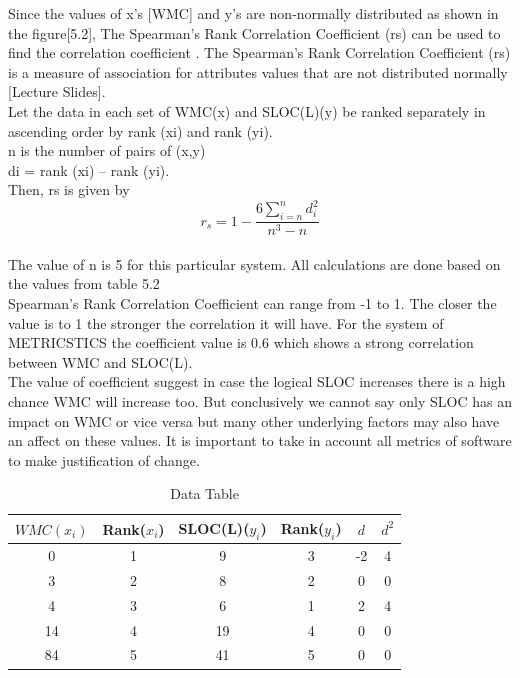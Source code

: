 \documentclass[12pt,letterpaper]{report}
\begin{document}
Since the values of x’s [WMC] and y’s are non-normally distributed as shown in the figure[5.2], The Spearman’s Rank Correlation Coefficient (rs) can be used to find the correlation coefficient . The Spearman’s Rank Correlation Coefficient (rs) is a measure of association for attributes values that are not distributed normally [Lecture Slides]. \\
Let the data in each set of WMC(x) and SLOC(L)(y) be ranked separately in ascending order by rank (xi) and rank (yi).\\
n is the number of pairs of (x,y)\\
di = rank (xi) – rank (yi).\\
Then, rs is given by 
\[ r_{s} = 1 - \frac{6\sum_{i=n}^{n}{d^{2}_i}}{n^{3}-n} \]\\
The value of n is 5 for this particular system. All calculations are done based on the values from table 5.2\\

Spearman’s Rank Correlation Coefficient can range from -1 to 1. The closer the value is to 1 the stronger the correlation it will have. For the system of METRICSTICS the coefficient value is 0.6 which shows a strong correlation between WMC and SLOC(L).\\

The value of coefficient suggest in case the logical SLOC increases there is a high chance WMC will increase too. But conclusively we cannot say only SLOC has an impact on WMC or vice versa but many other underlying factors may also have an affect on these values. It is important to take in account all metrics of software to make justification of change.

\begin{table}[htbp]
  \centering
  
  \begin{tabular}{|c|c|c|c|c|c|}
    \hline
    $WMC(x_i)$ & Rank($x_i$) & SLOC(L)($y_i$) & Rank($y_i$) & $d$ & $d^2$ \\
    \hline\hline
    0   & 1  & 9 & 3  & -2  & 4 \\
    3  & 2  & 8 & 2  & 0  & 0 \\
    4   & 3   & 6 & 1    & 2   & 4  \\
    14   & 4   & 19 & 4  &  0  & 0 \\ 
    84   & 5   & 41 & 5   &  0  & 0 \\
    
    \hline
  \end{tabular}
  \caption{Data Table}
\end{table}
\end{document}
